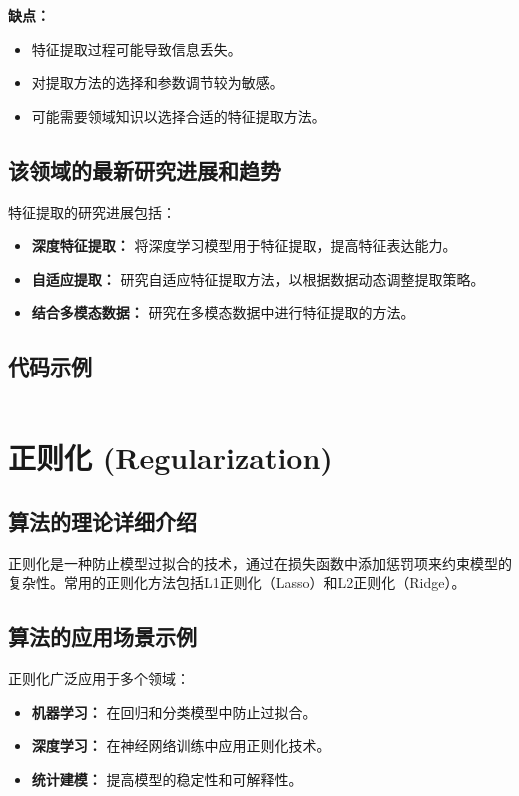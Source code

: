 \textbf{缺点：}
\begin{itemize}
    \item 特征提取过程可能导致信息丢失。
    \item 对提取方法的选择和参数调节较为敏感。
    \item 可能需要领域知识以选择合适的特征提取方法。
\end{itemize}

\subsection*{该领域的最新研究进展和趋势}
特征提取的研究进展包括：
\begin{itemize}
    \item \textbf{深度特征提取：} 将深度学习模型用于特征提取，提高特征表达能力。
    \item \textbf{自适应提取：} 研究自适应特征提取方法，以根据数据动态调整提取策略。
    \item \textbf{结合多模态数据：} 研究在多模态数据中进行特征提取的方法。
\end{itemize}
\subsection*{代码示例}
\begin{lstlisting}

\end{lstlisting}


\section{正则化 (Regularization)}
\subsection*{算法的理论详细介绍}
正则化是一种防止模型过拟合的技术，通过在损失函数中添加惩罚项来约束模型的复杂性。常用的正则化方法包括L1正则化（Lasso）和L2正则化（Ridge）。

\subsection*{算法的应用场景示例}
正则化广泛应用于多个领域：
\begin{itemize}
    \item \textbf{机器学习：} 在回归和分类模型中防止过拟合。
    \item \textbf{深度学习：} 在神经网络训练中应用正则化技术。
    \item \textbf{统计建模：} 提高模型的稳定性和可解释性。
\end{itemize}

